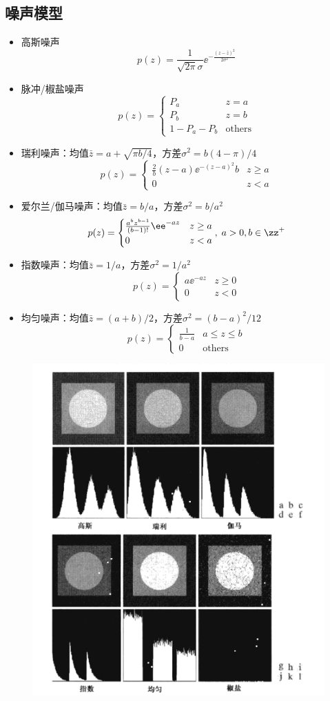 \subsection{噪声模型}
\begin{itemize}
\item 高斯噪声
\[p(z)=\frac{1}{\sqrt{2\pi}\sigma}\ee^{-\frac{(z-\bar{z})^2}{2\sigma^2}}\]
\item 脉冲/椒盐噪声
\[p(z)=\begin{cases}
P_a & z=a\\
P_b & z=b\\
1-P_a-P_b & \text{others}
\end{cases}\]
\item 瑞利噪声：均值$\bar{z}=a+\sqrt{\pi b/4}$，方差$\sigma^2=b(4-\pi)/4$
\[p(z)=\begin{cases}
\frac{2}{b}(z-a)\ee^{-(z-a)^2}{b} & z\geq a\\
0 & z<a
\end{cases}\]
\item 爱尔兰/伽马噪声：均值$\bar{z}=b/a$，方差$\sigma^2=b/a^2$
\[p(z)=\begin{cases}
\frac{a^bz^{b-1}}{(b-1)!}\ee^{-az} & z\geq a\\
0 & z<a
\end{cases},\;a>0,b\in\zz^+\]
\item 指数噪声：均值$\bar{z}=1/a$，方差$\sigma^2=1/a^2$
\[p(z)=\begin{cases}
a\ee^{-az} & z\geq 0\\
0 & z<0
\end{cases}\]
\item 均匀噪声：均值$\bar{z}=(a+b)/2$，方差$\sigma^2=(b-a)^2/12$
\[p(z)=\begin{cases}
\frac{1}{b-a} & a\leq z\leq b\\
0 & \text{others}
\end{cases}\]
\end{itemize}
\begin{figure}[H]
\centering
\includegraphics[width=0.5\linewidth]{fig/noise.png}
\end{figure}

